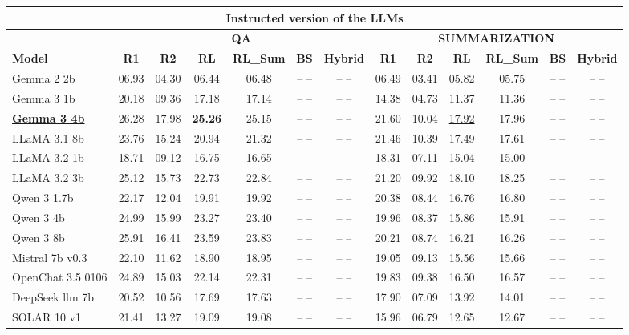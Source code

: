 \begin{table}[ht]
\begin{tabular}{lcccccc|cccccc}
\midrule
\multicolumn{13}{c}{\textbf{Instructed version of the LLMs}}  \\

\midrule
 & \multicolumn{6}{c|}{\textbf{QA}} & \multicolumn{6}{c}{\textbf{SUMMARIZATION}} \\
\midrule

\textbf{Model} & \textbf{R1} & \textbf{R2} & \textbf{RL} & \textbf{RL\_Sum} & \textbf{BS} & \textbf{Hybrid} & \textbf{R1} & \textbf{R2} & \textbf{RL} & \textbf{RL\_Sum} & \textbf{BS} & \textbf{Hybrid} \\
\midrule

Gemma 2 2b & 06.93 & 04.30 & 06.44 & 06.48 & -- -- & -- -- & 06.49 & 03.41 & 05.82 & 05.75 & -- -- & -- -- \\
Gemma 3 1b & 20.18 & 09.36 & 17.18 & 17.14 & -- -- & -- -- & 14.38 & 04.73 & 11.37 & 11.36 & -- -- & -- -- \\
\underline{\textbf{Gemma 3 4b}} & 26.28 & 17.98 & \textbf{25.26} & 25.15 & -- -- & -- -- & 21.60 & 10.04 & \underline{17.92} & 17.96 & -- -- & -- -- \\
LLaMA 3.1 8b & 23.76 & 15.24 & 20.94 & 21.32 & -- -- & -- -- & 21.46 & 10.39 & 17.49 & 17.61 & -- -- & -- -- \\
LLaMA 3.2 1b & 18.71 & 09.12 & 16.75 & 16.65 & -- -- & -- -- & 18.31 & 07.11 & 15.04 & 15.00 & -- -- & -- -- \\
LLaMA 3.2 3b & 25.12 & 15.73 & 22.73 & 22.84 & -- -- & -- -- & 21.20 & 09.92 & 18.10 & 18.25 & -- -- & -- -- \\
Qwen 3 1.7b & 22.17 & 12.04 & 19.91 & 19.92 & -- -- & -- -- & 20.38 & 08.44 & 16.76 & 16.80 & -- -- & -- -- \\
Qwen 3 4b & 24.99 & 15.99 & 23.27 & 23.40 & -- -- & -- -- & 19.96 & 08.37 & 15.86 & 15.91 & -- -- & -- -- \\
Qwen 3 8b & 25.91 & 16.41 & 23.59 & 23.83 & -- -- & -- -- & 20.21 & 08.74 & 16.21 & 16.26 & -- -- & -- -- \\
Mistral 7b v0.3 & 22.10 & 11.62 & 18.90 & 18.95 & -- -- & -- -- & 19.05 & 09.13 & 15.56 & 15.66 & -- -- & -- -- \\
OpenChat 3.5 0106 & 24.89 & 15.03 & 22.14 & 22.31 & -- -- & -- -- & 19.83 & 09.38 & 16.50 & 16.57 & -- -- & -- -- \\
DeepSeek llm 7b & 20.52 & 10.56 & 17.69 & 17.63 & -- -- & -- -- & 17.90 & 07.09 & 13.92 & 14.01 & -- -- & -- -- \\
SOLAR 10 v1 & 21.41 & 13.27 & 19.09 & 19.08 & -- -- & -- -- & 15.96 & 06.79 & 12.65 & 12.67 & -- -- & -- -- \\

\end{tabular}
\end{table}
